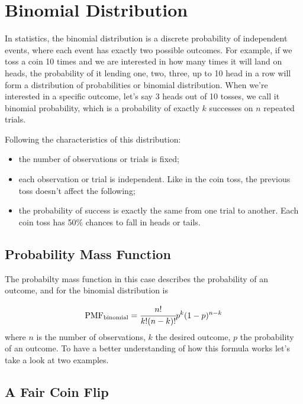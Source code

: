 \chapter{Binomial Distribution}\label{binomial-distribution}

In statistics, the binomial distribution is a discrete probability of
independent events, where each event has exactly two possible outcomes.
For example, if we toss a coin 10 times and we are interested in how
many times it will land on heads, the probability of it lending one,
two, three, up to 10 head in a row will form a distribution of
probabilities or binomial distribution. When we're interested in a
specific outcome, let's say 3 heads out of 10 tosses, we call it
binomial probability, which is a probability of exactly \(k\) successes
on \(n\) repeated trials.

Following the characteristics of this distribution:

\begin{itemize}
\tightlist
\item
  the number of observations or trials is fixed;
\item
  each observation or trial is independent. Like in the coin toss, the
  previous toss doesn't affect the following;
\item
  the probability of success is exactly the same from one trial to
  another. Each coin toss has 50\% chances to fall in heads or tails.
\end{itemize}

\section{Probability Mass Function}\label{probability-mass-function}

The probabilty mass function in this case describes the
probability of an outcome, and for the binomial distribution is

\begin{equation} \mathrm{PMF}_{\mathrm{binomial}} = \cfrac{n!}{k!(n-k)!}p^k (1-p)^{n-k}
\label{eq:binomial_pmf}
\end{equation}
where \(n\) is the number of observations, \(k\) the desired outcome,
\(p\) the probability of an outcome. To have a better understanding of
how this formula works let's take a look at two examples.

\section{A Fair Coin Flip}\label{a-fair-coin-flip}


